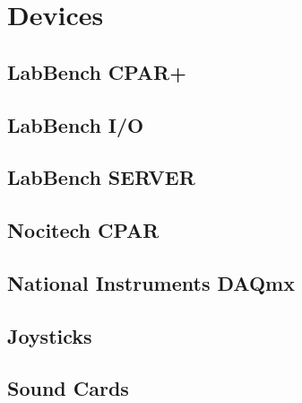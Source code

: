 \chapter{Devices}
\label{ch:Devices}

\section{LabBench CPAR+}

\section{LabBench I/O}

\section{LabBench SERVER}

\section{Nocitech CPAR}

\section{National Instruments DAQmx}

\section{Joysticks}

\section{Sound Cards}